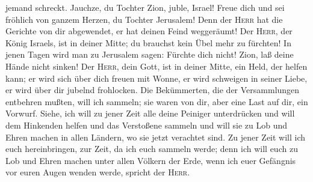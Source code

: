 jemand schreckt.  Jauchze, du Tochter Zion, juble,
Israel! Freue dich und sei fröhlich von ganzem Herzen, du Tochter
Jerusalem!  Denn der \textsc{Herr} hat die Gerichte von
dir abgewendet, er hat deinen Feind weggeräumt! Der \textsc{Herr}, der
König Israels, ist in deiner Mitte; du brauchst kein Übel mehr zu
fürchten!  In jenen Tagen wird man zu Jerusalem sagen:
Fürchte dich nicht! Zion, laß deine Hände nicht sinken! 
Der \textsc{Herr}, dein Gott, ist in deiner Mitte, ein Held, der helfen
kann; er wird sich über dich freuen mit Wonne, er wird schweigen in
seiner Liebe, er wird über dir jubelnd frohlocken.  Die
Bekümmerten, die der Versammlungen entbehren mußten, will ich sammeln;
sie waren von dir, aber eine Last auf dir, ein Vorwurf. 
Siehe, ich will zu jener Zeit alle deine Peiniger unterdrücken und will
dem Hinkenden helfen und das Verstoßene sammeln und will sie zu Lob und
Ehren machen in allen Ländern, wo sie jetzt verachtet sind.
 Zu jener Zeit will ich euch hereinbringen, zur Zeit, da
ich euch sammeln werde; denn ich will euch zu Lob und Ehren machen unter
allen Völkern der Erde, wenn ich euer Gefängnis vor euren Augen wenden
werde, spricht der \textsc{Herr}.
